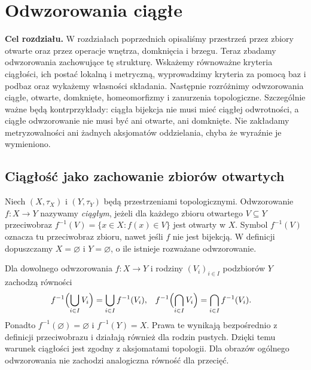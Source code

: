 \chapter{Odwzorowania ciągłe}
\label{ch:topog-odwzorowania-ciagle}

\noindent\textbf{Cel rozdziału.}
W rozdziałach poprzednich opisaliśmy przestrzeń przez zbiory otwarte
oraz przez operacje wnętrza, domknięcia i brzegu.
Teraz zbadamy odwzorowania zachowujące tę strukturę.
Wskażemy równoważne kryteria ciągłości, ich postać lokalną i metryczną,
wyprowadzimy kryteria za pomocą baz i podbaz oraz wykażemy
własności składania. Następnie rozróżnimy odwzorowania ciągłe,
otwarte, domknięte, homeomorfizmy i zanurzenia topologiczne.
Szczególnie ważne będą kontrprzykłady: ciągła bijekcja nie musi mieć
ciągłej odwrotności, a ciągłe odwzorowanie nie musi być ani otwarte,
ani domknięte. Nie zakładamy metryzowalności ani żadnych aksjomatów
oddzielania, chyba że wyraźnie je wymieniono.

\section{Ciągłość jako zachowanie zbiorów otwartych}
\label{sec:topog-ciaglosc-definicja}

\begin{definicja}
\label{def:topog-odwzorowanie-ciagle}
Niech $(X,\tau_X)$ i $(Y,\tau_Y)$ będą przestrzeniami topologicznymi.
Odwzorowanie $f\colon X\to Y$ nazywamy \emph{ciągłym}, jeżeli dla
każdego zbioru otwartego $V\subseteq Y$ przeciwobraz
$f^{-1}(V)=\{x\in X:f(x)\in V\}$ jest otwarty w $X$.
Symbol $f^{-1}(V)$ oznacza tu przeciwobraz zbioru, nawet jeśli $f$
nie jest bijekcją. W definicji dopuszczamy $X=\varnothing$
i $Y=\varnothing$, o ile istnieje rozważane odwzorowanie.
\end{definicja}

\begin{uwaga}
Dla dowolnego odwzorowania $f\colon X\to Y$ i rodziny
$(V_i)_{i\in I}$ podzbiorów $Y$ zachodzą równości
\begin{align*}
f^{-1}\Bigl(\bigcup_{i\in I}V_i\Bigr)
 &=\bigcup_{i\in I}f^{-1}(V_i), &
f^{-1}\Bigl(\bigcap_{i\in I}V_i\Bigr)
 &=\bigcap_{i\in I}f^{-1}(V_i).
\end{align*}
Ponadto $f^{-1}(\varnothing)=\varnothing$ i $f^{-1}(Y)=X$.
Prawa te wynikają bezpośrednio z definicji przeciwobrazu i działają
również dla rodzin pustych. Dzięki temu warunek ciągłości jest
zgodny z aksjomatami topologii. Dla obrazów ogólnego odwzorowania
nie zachodzi analogiczna równość dla przecięć.
\end{uwaga}

